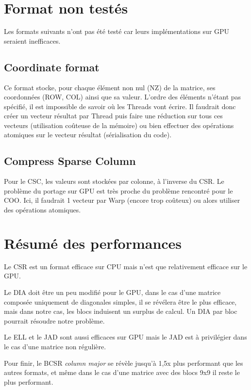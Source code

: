 \documentclass[a4paper,11pt]{report}
\begin{document}
\clearpage
 \section{Format non testés}
  Les formats suivants n'ont pas été testé car leurs implémentations
  sur GPU seraient inefficaces.

  \subsection[COO : Coordinate format]{Coordinate format}
   
   Ce format stocke, pour chaque élément non nul (NZ) de la matrice,
   ses coordonnées (ROW, COL) ainsi que sa valeur. L'ordre des
   éléments n'étant pas spécifié, il est impossible de savoir où les
   Threads vont écrire. Il faudrait donc créer un vecteur résultat par
   Thread puis faire une réduction sur tous ces vecteurs (utilisation
   coûteuse de la mémoire) ou bien effectuer des opérations atomiques
   sur le vecteur résultat (sérialisation du code).
   
  \subsection[CSC : Compress Sparse Column]{Compress Sparse Column}
   Pour le CSC, les valeurs sont stockées par colonne, à l'inverse du CSR.
   Le problème du portage sur GPU est très proche du problème
   rencontré pour le COO. Ici, il faudrait 1 vecteur par Warp (encore
   trop coûteux) ou alors utiliser des opérations atomiques.

 \section{Résumé des performances}
  Le CSR est un format efficace sur CPU mais n'est que relativement
  efficace sur le GPU.

  Le DIA doit être un peu modifié pour le GPU, dans le cas d'une
  matrice composée uniquement de diagonales simples, il se révélera être
  le plus efficace, mais dans notre cas, les blocs induisent un
  surplus de calcul. Un DIA par bloc pourrait résoudre notre problème.

  Le ELL et le JAD sont aussi efficaces sur GPU mais le JAD est à
  privilégier dans le cas d'une matrice non régulière.

  Pour finir, le BCSR \textit{column major} se révèle jusqu'à 1,5x
  plus performant que les autres formats, et même dans le cas d'une
  matrice avec des blocs 9x9 il reste le plus performant.
\end{document}
